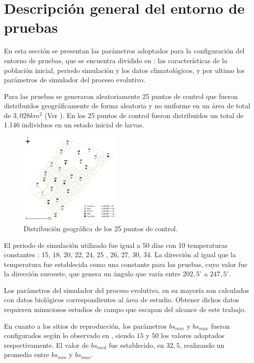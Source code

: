 \section{Descripción general del entorno de pruebas}
En esta sección se presentan las parámetros adoptados para la configuración del entorno de
pruebas, que se encuentra dividido en : las características de la población inicial, periodo
simulación y los datos climatológicos, y por ultimo los parámetros de simulador del proceso
evolutivo.

Para las pruebas se generaron aleatoriamente 25 puntos de control que fueron distribuidos
geográficamente de forma aleatoria y no uniforme en un área de total de $3,028 km^{2}$
(Ver ). En los 25 puntos de control fueron distribuidos un total de
1.146 individuos en un estado inicial de larvas.

\begin{figure}[!htpb]
    \centering
    \includegraphics[width=0.45\textwidth]{../book/capitulo-6/graphics/extension-poblacion.png}
    \caption{\label{fig:distribucion-puntos}Distribución geográfica de los 25 puntos de control.}
\end{figure}

El periodo de simulación utilizado fue igual a 50 días con 10 temperaturas constantes :
15\textcelsius , 18\textcelsius , 20\textcelsius , 22\textcelsius , 24\textcelsius , 25\textcelsius
, 26\textcelsius , 27\textcelsius , 30\textcelsius , 34\textcelsius. La dirección al igual que la
temperatura fue establecida como una constante para las pruebas, cuyo valor fue la dirección
suroeste, que genera un ángulo que varía entre $202,5^{\circ}$ a $247,5^{\circ}$.

Los parámetros del simulador del proceso evolutivo, en su mayoría son calculados con datos
biológicos correspondientes al área de estudio. Obtener dichos datos requieren minuciosos estudios
de campo que escapan del alcance de este trabajo.

En cuanto a los sitios de reproducción, los parámetros $bs_{min}$ y $bs_{max}$ fueron
configurados según lo observado en \cite{otero2006stochastic, otero2008stochastic}, siendo $15$ y
$50$ los valores adoptados respectivamente.  El valor de $bs_{med}$ fue establecido, en $32,5$,
realizando un promedio entre $bs_{min}$ y $bs_{max}$.

